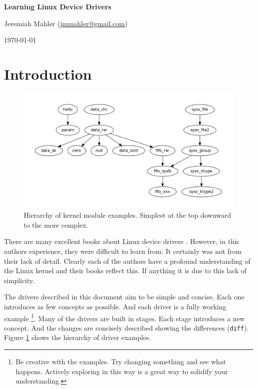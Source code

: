 \documentclass{article}
\begin{document}
\VerbatimFootnotes


\thispagestyle{empty}

\centerline{\Large \textbf{Learning Linux Device Drivers}}
\vspace{0.1in}
\centerline{\normalsize {Jeremiah Mahler} ({\href{mailto:jmmahler@gmail.com}{jmmahler@gmail.com}})}
\centerline{\small \today}
\vspace{0.2in}


\tableofcontents
\pagebreak

\section{Introduction}

\begin{figure}[h!]
\begin{center}
\includegraphics[scale=0.6]{hierarchy/hier}
\end{center}
\caption{Hierarchy of kernel module examples.  Simplest at the
top downward to the more complex.}\label{fig:hier}
\end{figure}

There are many excellent books about Linux device drivers
\autocite{corbet2009linux}
\autocite{venkateswaran2008essential}
\autocite{love2010linux}
\autocite{love2013linux}.
However, in this authors experience, they were difficult to learn from.
It certainly was not from their lack of detail.
Clearly each of the authors have a profound understanding of the Linux
kernel and their books reflect this.
If anything it is due to this lack of simplicity.

The drivers described in this document aim to be simple and concise.
Each one introduces as few concepts as possible.
And each driver is a fully working example
\footnote{Be creative with the examples.
Try changing something and see what happens.
Actively exploring in this way is a great way to solidify your understanding.}.
Many of the drivers are built in stages.
Each stage introduces a new concept.
And the changes are concisely described showing the
differences (\verb+diff+).
Figure \ref{fig:hier} shows the hierarchy of driver examples.
\end{document}
